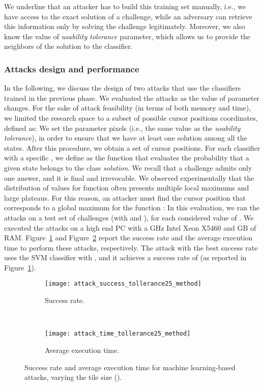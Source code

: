 \documentclass[conference]{IEEEtran}
\begin{document}
We underline that an attacker has to build this training set manually, i.e., we have access to the exact solution of a challenge, while an adversary can retrieve this information only by solving the challenge legitimately.
Moreover, we also know the value of \textit{usability tolerance} parameter, which allows us to provide the neighbors of the solution to the classifier.


\subsubsection{Attacks design and performance}
\label{attackandperformance}
In the following, we discuss the design of two attacks that use the classifiers trained in the previous phase.
We evaluated the attacks as the value of parameter  changes.
For the sake of attack feasibility (in terms of both memory and time), we limited the research space to a subset of  possible cursor positions coordinates, defined as: 
We set the parameter  pixels (i.e., the same value as the \textit{usability tolerance}), in order to ensure that we have at least one solution among all the states.
After this procedure, we obtain a set of  cursor positions. For each classifier with a specific , we define  as the function that evaluates the probability that a given state  belongs to the class \textit{solution}. 
We recall that a challenge admits only one answer, and it is final and irrevocable.
We observed experimentally that the distribution of values for function  
often presents multiple local maximums and large plateaus. For this reason, an attacker must find the cursor position  that corresponds to a global maximum for the function : 
In this evaluation, we ran the attacks on a test set of  challenges (with  and ), for each considered value of . 
We executed the attacks on a high end PC with a  GHz Intel Xeon X5460 and  GB of RAM.
Figure~\ref{fig:successRateML} and Figure~\ref{fig:timeML} report the success rate and the average execution time to perform these attacks, respectively.
The attack with the best success rate uses the SVM classifier with , and it achieves a success rate of  (as reported in Figure~\ref{fig:successRateML}).

\begin{figure}[ht!]
\centering
\begin{subfigure}{.45\textwidth}
\texttt{[image: attack\_success\_tollerance25\_method]}\caption{Success rate.}
\label{fig:successRateML}
\end{subfigure}
\\
\begin{subfigure}{.45\textwidth}
\texttt{[image: attack\_time\_tollerance25\_method]}\caption{Average execution time.}
\label{fig:timeML}
\end{subfigure}
\vspace{-0.cm}
\caption{Success rate and average execution time for machine learning-based attacks, varying the tile size ().}
\label{fig:MLSuccess}
\end{figure}
\end{document}
